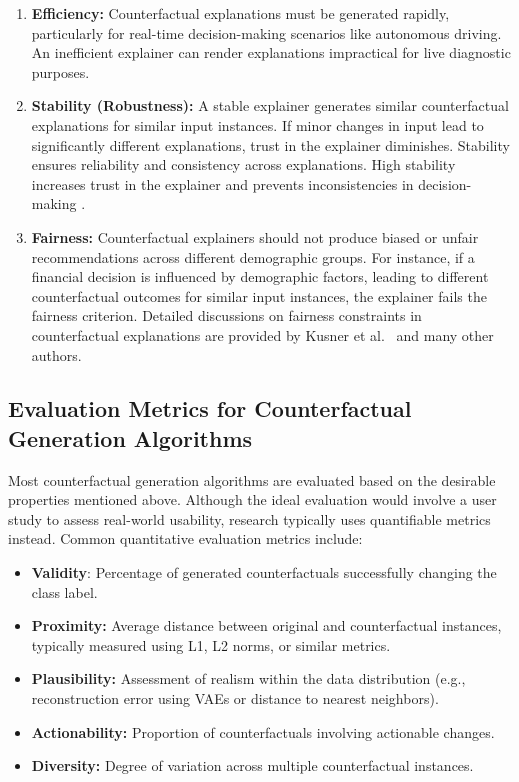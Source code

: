 \begin{enumerate}
    \item \textbf{Efficiency:}  
    Counterfactual explanations must be generated rapidly, particularly for real-time decision-making scenarios like autonomous driving. An inefficient explainer can render explanations impractical for live diagnostic purposes.

    \item \textbf{Stability (Robustness):}  
    A stable explainer generates similar counterfactual explanations for similar input instances. If minor changes in input lead to significantly different explanations, trust in the explainer diminishes. Stability ensures reliability and consistency across explanations. High stability increases trust in the explainer and prevents inconsistencies in decision-making \cite{9660058} \cite{Kanamori:AISTATS2022}.

    \item \textbf{Fairness:}  
    Counterfactual explainers should not produce biased or unfair recommendations across different demographic groups. For instance, if a financial decision is influenced by demographic factors, leading to different counterfactual outcomes for similar input instances, the explainer fails the fairness criterion. Detailed discussions on fairness constraints in counterfactual explanations are provided by Kusner et al.~\cite{DBLP:journals/corr/abs-2010-10596} and many other authors.
\end{enumerate}

\subsection{Evaluation Metrics for Counterfactual Generation Algorithms}
Most counterfactual generation algorithms are evaluated based on the desirable properties mentioned above. Although the ideal evaluation would involve a user study to assess real-world usability, research typically uses quantifiable metrics instead. Common quantitative evaluation metrics include:

\begin{itemize}
    \item \textbf{Validity}: Percentage of generated counterfactuals successfully changing the class label.
    \item \textbf{Proximity:} Average distance between original and counterfactual instances, typically measured using L1, L2 norms, or similar metrics.
    \item \textbf{Plausibility:} Assessment of realism within the data distribution (e.g., reconstruction error using VAEs or distance to nearest neighbors).
    \item \textbf{Actionability:} Proportion of counterfactuals involving actionable changes.
    \item \textbf{Diversity:} Degree of variation across multiple counterfactual instances.
\end{itemize}

